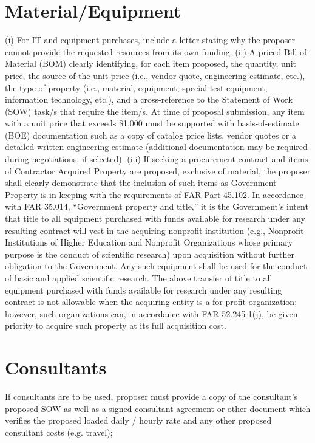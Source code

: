 \section{Material/Equipment}
(i) For IT and equipment purchases, include a letter stating why the proposer cannot provide
the requested resources from its own funding.
(ii) A priced Bill of Material (BOM) clearly identifying, for each item proposed, the
quantity, unit price, the source of the unit price (i.e., vendor quote, engineering estimate,
etc.), the type of property (i.e., material, equipment, special test equipment, information
technology, etc.), and a cross-reference to the Statement of Work (SOW) task/s that require
the item/s. At time of proposal submission, any item with a unit price that exceeds \$1,000
must be supported with basis-of-estimate (BOE) documentation such as a copy of catalog
price lists, vendor quotes or a detailed written engineering estimate (additional
documentation may be required during negotiations, if selected).
(iii) If seeking a procurement contract and items of Contractor Acquired Property are
proposed, exclusive of material, the proposer shall clearly demonstrate that the inclusion of
such items as Government Property is in keeping with the requirements of FAR Part 45.102.
In accordance with FAR 35.014, “Government property and title,” it is the Government’s
intent that title to all equipment purchased with funds available for research under any
resulting contract will vest in the acquiring nonprofit institution (e.g., Nonprofit Institutions
of Higher Education and Nonprofit Organizations whose primary purpose is the conduct of
scientific research) upon acquisition without further obligation to the Government. Any such
equipment shall be used for the conduct of basic and applied scientific research. The above
transfer of title to all equipment purchased with funds available for research under any
resulting contract is not allowable when the acquiring entity is a for-profit organization;
however, such organizations can, in accordance with FAR 52.245-1(j), be given priority to
acquire such property at its full acquisition cost.
\section{Consultants}
If consultants are to be used, proposer must provide a copy of the consultant’s proposed
SOW as well as a signed consultant agreement or other document which verifies the
proposed loaded daily / hourly rate and any other proposed consultant costs (e.g. travel);
